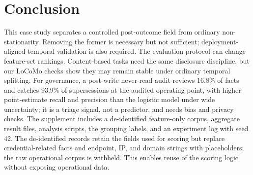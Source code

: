 \documentclass[sigconf,nonacm]{acmart}
\begin{document}
\section{Conclusion}
This case study separates a controlled post-outcome field from ordinary non-stationarity. Removing the former is necessary but not sufficient; deployment-aligned temporal validation is also required. The evaluation protocol can change feature-set rankings. Content-based tasks need the same disclosure discipline, but our LoCoMo checks show they may remain stable under ordinary temporal splitting. For governance, a post-write never-read audit reviews 16.8\% of facts and catches 93.9\% of supersessions at the audited operating point, with higher point-estimate recall and precision than the logistic model under wide uncertainty; it is a triage signal, not a predictor, and needs bias and privacy checks. The supplement includes a de-identified feature-only corpus, aggregate result files, analysis scripts, the grouping labels, and an experiment log with seed 42. The de-identified records retain the fields used for scoring but replace credential-related facts and endpoint, IP, and domain strings with placeholders; the raw operational corpus is withheld. This enables reuse of the scoring logic without exposing operational data.
\end{document}
